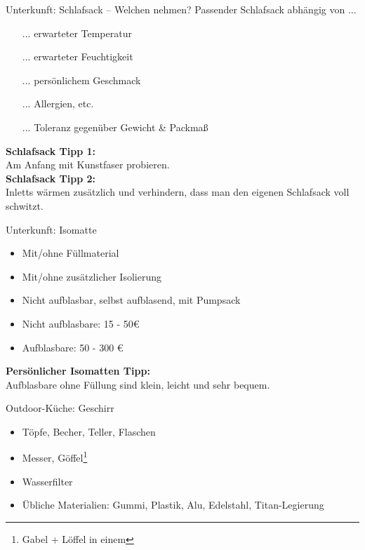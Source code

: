 \documentclass{beamer}
\newcommand{\tipp}[2][Tipp:]{\vspace{0.2cm}\textbf{#1:}\\#2}
\begin{document}
			\begin{frame}{Unterkunft: Schlafsack -- Welchen nehmen?}
				Passender Schlafsack abhängig von ...
				\begin{itemize}
					\item[...] erwarteter Temperatur
					\item[...] erwarteter Feuchtigkeit
					\item[...] persönlichem Geschmack
					\item[...] Allergien, etc.
					\item[...] Toleranz gegenüber Gewicht \& Packmaß
				\end{itemize}\pause
				\tipp[Schlafsack Tipp 1]{Am Anfang mit Kunstfaser probieren.}\\\pause
				\tipp[Schlafsack Tipp 2]{Inletts wärmen zusätzlich und verhindern, dass man den eigenen Schlafsack voll schwitzt.}
			\end{frame}
			
			\begin{frame}{Unterkunft: Isomatte}
				\begin{itemize}
					\item Mit/ohne Füllmaterial
					\item Mit/ohne zusätzlicher Isolierung
					\item Nicht aufblasbar, selbst aufblasend, mit Pumpsack
					\item Nicht aufblasbare: 15 - 50€
					\item Aufblasbare: 50 - 300 €
				\end{itemize}\pause
				\tipp[Persönlicher Isomatten Tipp]{Aufblasbare ohne Füllung sind klein, leicht und sehr bequem.}\\
			\end{frame}
			
			\begin{frame}{Outdoor-Küche: Geschirr}
				\begin{itemize}
					\item Töpfe, Becher, Teller, Flaschen
					\item Messer, Göffel\footnote{Gabel + Löffel in einem}
					\item Wasserfilter
					\item Übliche Materialien: Gummi, Plastik, Alu, Edelstahl, Titan-Legierung
				\end{itemize}
			\end{frame}
			
\end{document}
